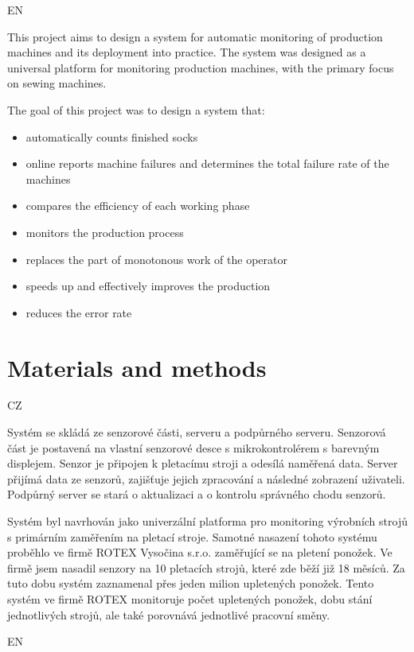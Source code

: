 \documentclass[12pt, a4paper]{article}
\begin{document}
EN

This project aims to design a system for automatic monitoring of production machines and its deployment into practice.
The system was designed as a universal platform for monitoring production machines, with the primary focus on sewing machines.

The goal of this project was to design a system that:

\begin{itemize}
    \item automatically counts finished socks
    \item online reports machine failures and determines the total failure rate of the machines
    \item compares the efficiency of each working phase
    \item monitors the production process
    \item replaces the part of monotonous work of the operator
    \item speeds up and effectively improves the production
    \item reduces the error rate
\end{itemize}


\section*{Materials and methods}
CZ

Systém se skládá ze senzorové části, serveru a podpůrného serveru.
Senzorová část je postavená na vlastní senzorové desce s mikrokontrolérem s barevným displejem.
Senzor je připojen k pletacímu stroji a odesílá naměřená data.
Server přijímá  data ze senzorů, zajišťuje jejich zpracování a následné zobrazení uživateli.
Podpůrný server se stará o aktualizaci a o kontrolu správného chodu senzorů.

Systém byl navrhován jako univerzální platforma pro monitoring výrobních strojů s primárním zaměřením na pletací stroje.
Samotné nasazení tohoto systému proběhlo ve firmě ROTEX Vysočina s.r.o. zaměřující se na pletení ponožek.
Ve firmě jsem nasadil senzory na 10 pletacích strojů, které zde běží již 18 měsíců.
Za tuto dobu systém zaznamenal přes jeden milion upletených ponožek.
Tento systém ve firmě ROTEX monitoruje počet upletených ponožek, dobu stání jednotlivých strojů, ale také porovnává jednotlivé pracovní směny.

EN
\end{document}
